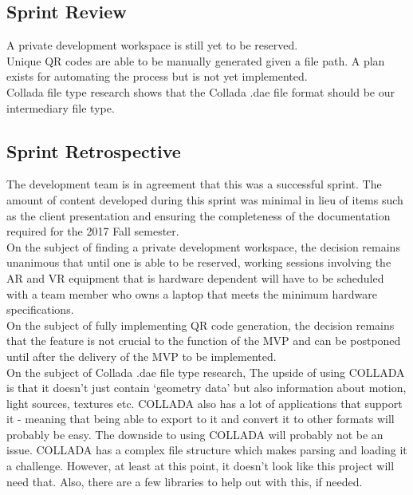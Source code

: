     \subsection{Sprint Review}
    \label{sec:Sprint5_review}
        \hspace{7mm}
        A private development workspace is still yet to be reserved.\\

        Unique QR codes are able to be manually generated given a file path.  A plan exists for automating
        the process but is not yet implemented.\\
        
        Collada file type research shows that the Collada .dae file format should be our intermediary file type.

    \subsection{Sprint Retrospective}
    \label{sec:Sprint5_retrospective}
        \hspace{7mm}
        The development team is in agreement that this was a successful sprint.  The amount of
        content developed during this sprint was minimal in lieu of items such as the client 
        presentation and ensuring the completeness of the documentation required for the 2017
        Fall semester.\\
        
        On the subject of finding a private development workspace, the decision remains unanimous that until one 
        is able to be reserved, working sessions involving the AR and VR equipment that is hardware dependent 
        will have to be scheduled with a team member who owns a laptop that meets the minimum hardware
        specifications.\\

        On the subject of fully implementing QR code generation, the decision remains that 
        the feature is not crucial to the function of the MVP and can be postponed until after the delivery
        of the MVP to be implemented.\\

        On the subject of Collada .dae file type research, The upside of using COLLADA is that it doesn't just 
        contain `geometry data' but also information about motion, light sources, textures etc. COLLADA also 
        has a lot of applications that support it - meaning that being able to export to it and convert it to 
        other formats will probably be easy. The downside to using COLLADA will probably not be an issue. 
        COLLADA has a complex file structure which makes parsing and loading it a challenge. However, at least 
        at this point, it doesn't look like this project will need that. Also, there are a few libraries to 
        help out with this, if needed.\\